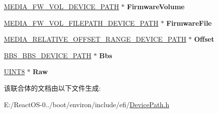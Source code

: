 \begin{DoxyCompactItemize}
\hyperlink{struct_m_e_d_i_a___f_w___v_o_l___d_e_v_i_c_e___p_a_t_h}{M\+E\+D\+I\+A\+\_\+\+F\+W\+\_\+\+V\+O\+L\+\_\+\+D\+E\+V\+I\+C\+E\+\_\+\+P\+A\+TH} $\ast$ {\bfseries Firmware\+Volume}
\item 
\mbox{\label{union_e_f_i___d_e_v___p_a_t_h___p_t_r_a228fa6a419269a8e793a8b268c74435b}} 
\hyperlink{struct_m_e_d_i_a___f_w___v_o_l___f_i_l_e_p_a_t_h___d_e_v_i_c_e___p_a_t_h}{M\+E\+D\+I\+A\+\_\+\+F\+W\+\_\+\+V\+O\+L\+\_\+\+F\+I\+L\+E\+P\+A\+T\+H\+\_\+\+D\+E\+V\+I\+C\+E\+\_\+\+P\+A\+TH} $\ast$ {\bfseries Firmware\+File}
\item 
\mbox{\label{union_e_f_i___d_e_v___p_a_t_h___p_t_r_a207766da3cef38e2125a2495ef45bd49}} 
\hyperlink{struct_m_e_d_i_a___r_e_l_a_t_i_v_e___o_f_f_s_e_t___r_a_n_g_e___d_e_v_i_c_e___p_a_t_h}{M\+E\+D\+I\+A\+\_\+\+R\+E\+L\+A\+T\+I\+V\+E\+\_\+\+O\+F\+F\+S\+E\+T\+\_\+\+R\+A\+N\+G\+E\+\_\+\+D\+E\+V\+I\+C\+E\+\_\+\+P\+A\+TH} $\ast$ {\bfseries Offset}
\item 
\mbox{\label{union_e_f_i___d_e_v___p_a_t_h___p_t_r_ad227a0f225de910c13bab46e7b0a72e7}} 
\hyperlink{struct_b_b_s___b_b_s___d_e_v_i_c_e___p_a_t_h}{B\+B\+S\+\_\+\+B\+B\+S\+\_\+\+D\+E\+V\+I\+C\+E\+\_\+\+P\+A\+TH} $\ast$ {\bfseries Bbs}
\item 
\mbox{\label{union_e_f_i___d_e_v___p_a_t_h___p_t_r_ab03d5547363a0a00c0583e4616d5331f}} 
\hyperlink{_processor_bind_8h_ab27e9918b538ce9d8ca692479b375b6a}{U\+I\+N\+T8} $\ast$ {\bfseries Raw}
\end{DoxyCompactItemize}


该联合体的文档由以下文件生成\+:\begin{DoxyCompactItemize}
\item 
E\+:/\+React\+O\+S-\/0../boot/environ/include/efi/\hyperlink{_device_path_8h}{Device\+Path.\+h}\end{DoxyCompactItemize}
